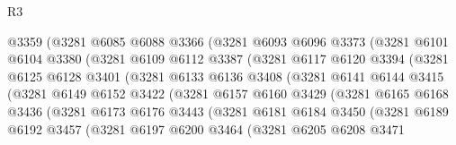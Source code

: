 \begin{lexlean}{R3}
\begin{coremodule}
                  @3359
                  (@3281
                    @6085
                    @6088
                    @3366
                    (@3281
                      @6093
                      @6096
                      @3373
                      (@3281
                        @6101
                        @6104
                        @3380
                        (@3281
                          @6109
                          @6112
                          @3387
                          (@3281
                            @6117
                            @6120
                            @3394
                            (@3281
                              @6125
                              @6128
                              @3401
                              (@3281
                                @6133
                                @6136
                                @3408
                                (@3281
                                  @6141
                                  @6144
                                  @3415
                                  (@3281
                                    @6149
                                    @6152
                                    @3422
                                    (@3281
                                      @6157
                                      @6160
                                      @3429
                                      (@3281
                                        @6165
                                        @6168
                                        @3436
                                        (@3281
                                          @6173
                                          @6176
                                          @3443
                                          (@3281
                                            @6181
                                            @6184
                                            @3450
                                            (@3281
                                              @6189
                                              @6192
                                              @3457
                                              (@3281
                                                @6197
                                                @6200
                                                @3464
                                                (@3281
                                                  @6205
                                                  @6208
                                                  @3471

\end{coremodule}
\end{lexlean}
